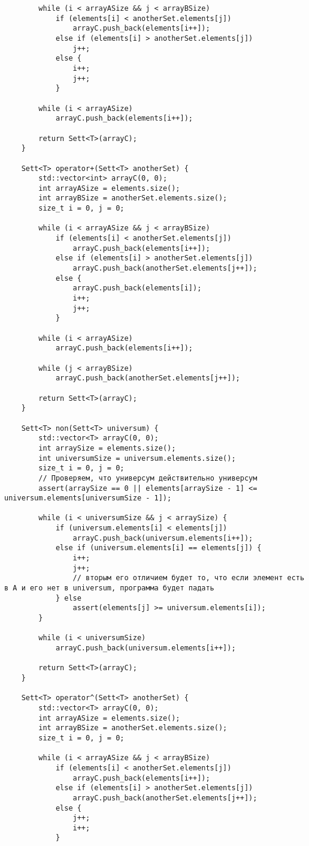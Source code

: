 \documentclass[a4paper,14pt]{extarticle}
\begin{document}
\begin{enumerate}[№1. ]
\begin{verbatim}
		while (i < arrayASize && j < arrayBSize)
			if (elements[i] < anotherSet.elements[j])
				arrayC.push_back(elements[i++]);
			else if (elements[i] > anotherSet.elements[j])
				j++;
			else {
				i++;
				j++;
			}
		
		while (i < arrayASize)
			arrayC.push_back(elements[i++]);
		
		return Sett<T>(arrayC);
	}
	
	Sett<T> operator+(Sett<T> anotherSet) {
		std::vector<int> arrayC(0, 0);
		int arrayASize = elements.size();
		int arrayBSize = anotherSet.elements.size();
		size_t i = 0, j = 0;
		
		while (i < arrayASize && j < arrayBSize)
			if (elements[i] < anotherSet.elements[j])
				arrayC.push_back(elements[i++]);
			else if (elements[i] > anotherSet.elements[j])
				arrayC.push_back(anotherSet.elements[j++]);
			else {
				arrayC.push_back(elements[i]);
				i++;
				j++;
			}
		
		while (i < arrayASize)
			arrayC.push_back(elements[i++]);
		
		while (j < arrayBSize)
			arrayC.push_back(anotherSet.elements[j++]);
		
		return Sett<T>(arrayC);
	}
	
	Sett<T> non(Sett<T> universum) {
		std::vector<T> arrayC(0, 0);
		int arraySize = elements.size();
		int universumSize = universum.elements.size();
		size_t i = 0, j = 0;
		// Проверяем, что универсум действительно универсум
		assert(arraySize == 0 || elements[arraySize - 1] <= universum.elements[universumSize - 1]);
		
		while (i < universumSize && j < arraySize) {
			if (universum.elements[i] < elements[j])
				arrayC.push_back(universum.elements[i++]);
			else if (universum.elements[i] == elements[j]) {
				i++;
				j++;
				// вторым его отличием будет то, что если элемент есть в A и его нет в universum, программа будет падать
			} else
				assert(elements[j] >= universum.elements[i]);
		}
		
		while (i < universumSize)
			arrayC.push_back(universum.elements[i++]);
		
		return Sett<T>(arrayC);
	}
	
	Sett<T> operator^(Sett<T> anotherSet) {
		std::vector<T> arrayC(0, 0);
		int arrayASize = elements.size();
		int arrayBSize = anotherSet.elements.size();
		size_t i = 0, j = 0;
		
		while (i < arrayASize && j < arrayBSize)
			if (elements[i] < anotherSet.elements[j])
				arrayC.push_back(elements[i++]);
			else if (elements[i] > anotherSet.elements[j])
				arrayC.push_back(anotherSet.elements[j++]);
			else {
				j++;
				i++;
			}
		

\end{verbatim}
\end{enumerate}
\end{document}
